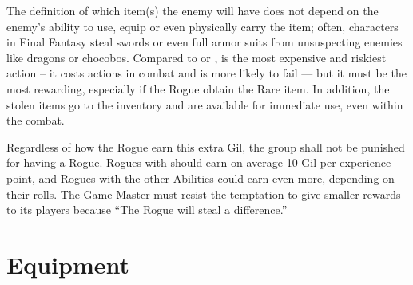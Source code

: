 \begin{multicols}{2}
The definition of which item(s) the enemy will have does not depend on the enemy's ability to use, equip or even physically carry the item; often, characters in Final Fantasy steal swords or even full armor suits from unsuspecting enemies like dragons or chocobos. Compared to  or ,  is the most expensive and riskiest action – it costs actions in combat and is more likely to fail --- but it must be the most rewarding, especially if the Rogue obtain the Rare item. In addition, the stolen items go to the inventory and are available for immediate use, even within the combat. %

Regardless of how the Rogue earn this extra Gil, the group shall not be punished for having a Rogue. Rogues with  should earn on average 10 Gil per experience point, and Rogues with the other Abilities could earn even more, depending on their rolls. The Game Master must resist the temptation to give smaller rewards to its players because ``The Rogue will steal a difference.''
\end{multicols}
\clearpage

\section{Equipment}\label{sec:inv-equip}

